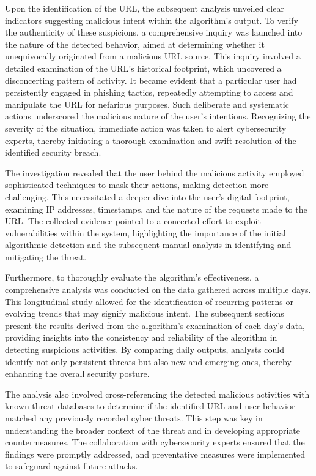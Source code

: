 Upon the identification of the URL, the subsequent analysis unveiled clear indicators suggesting malicious intent within the algorithm's output. To verify the authenticity of these suspicions, a comprehensive inquiry was launched into the nature of the detected behavior, aimed at determining whether it unequivocally originated from a malicious URL source. This inquiry involved a detailed examination of the URL's historical footprint, which uncovered a disconcerting pattern of activity. It became evident that a particular user had persistently engaged in phishing tactics, repeatedly attempting to access and manipulate the URL for nefarious purposes. Such deliberate and systematic actions underscored the malicious nature of the user's intentions. Recognizing the severity of the situation, immediate action was taken to alert cybersecurity experts, thereby initiating a thorough examination and swift resolution of the identified security breach.

The investigation revealed that the user behind the malicious activity employed sophisticated techniques to mask their actions, making detection more challenging. This necessitated a deeper dive into the user's digital footprint, examining IP addresses, timestamps, and the nature of the requests made to the URL. The collected evidence pointed to a concerted effort to exploit vulnerabilities within the system, highlighting the importance of the initial algorithmic detection and the subsequent manual analysis in identifying and mitigating the threat.

Furthermore, to thoroughly evaluate the algorithm's effectiveness, a comprehensive analysis was conducted on the data gathered across multiple days. This longitudinal study allowed for the identification of recurring patterns or evolving trends that may signify malicious intent. The subsequent sections present the results derived from the algorithm's examination of each day's data, providing insights into the consistency and reliability of the algorithm in detecting suspicious activities. By comparing daily outputs, analysts could identify not only persistent threats but also new and emerging ones, thereby enhancing the overall security posture.

The analysis also involved cross-referencing the detected malicious activities with known threat databases to determine if the identified URL and user behavior matched any previously recorded cyber threats. This step was key in understanding the broader context of the threat and in developing appropriate countermeasures. The collaboration with cybersecurity experts ensured that the findings were promptly addressed, and preventative measures were implemented to safeguard against future attacks.

